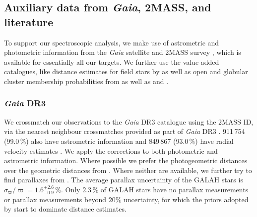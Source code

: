 \documentclass[
  journal=pasa,
  manuscript=research-paper, %
  year=2024,
  volume=37
]{cup-journal}
\newcommand{\Gaia}{\textit{Gaia}\xspace}
\begin{document}
\subsection{Auxiliary data from \Gaia, 2MASS, and literature} \label{sec:non-spec_data}


To support our spectroscopic analysis, we make use of astrometric and photometric information from the \Gaia satellite \citep{Gaia-Collaboration2016} and 2MASS survey \citep{Skrutskie2006}, which is available for essentially all our targets. We further use the value-added catalogues, like distance estimates for field stars by \citet{BailerJones2021} as well as open and globular cluster membership probabilities from \citet{CantatGaudin2020} as well as \citet{Vasiliev2021} and \citet{Baumgardt2021}.

\subsubsection{\Gaia DR3}

We crossmatch our observations to the \Gaia DR3 catalogue \citep{Brown2021,GaiaDR3} using the 2MASS ID, via the nearest neighbour crossmatches provided as part of \Gaia DR3 \citep{Torra2021}. 
911\,754 (99.0\,\%) also have astrometric information \citep{Lindegren2021a} and 849\,867 (93.0\,\%) have radial velocity estimates \citep{Katz2023}. We apply the corrections to both photometric \citep{Riello2021} and astrometric \citep{Lindegren2021b} information. Where possible we prefer the photogeometric distances over the geometric distances from \citep{BailerJones2021}. Where neither are available, we further try to find parallaxes from \cite{vanLeeuwen2007}. The average parallax uncertainty of the GALAH stars is $\sigma_{\varpi} / \varpi = 1.6_{-0.9}^{+2.6}\,\mathrm{\%}$. Only $2.3\,\%$ of GALAH stars have no parallax measurements or parallax measurements beyond $20\%$ uncertainty, for which the priors adopted by \citep{BailerJones2021} start to dominate distance estimates.
\end{document}
